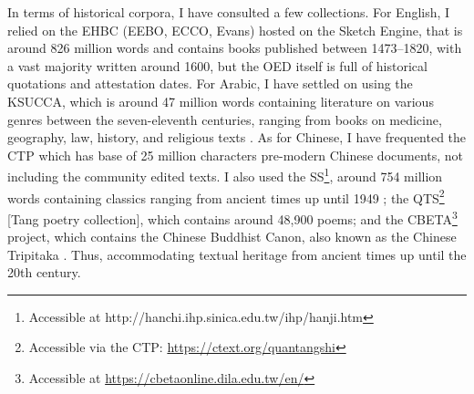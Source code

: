 In terms of historical corpora, I have consulted a few collections. For English, I relied on the \gls{EHBC} (EEBO, ECCO, Evans) hosted on the Sketch Engine, that is around 826 million words and contains books published between 1473--1820, with a vast majority written around 1600, but the \gls{OED} itself is full of historical quotations and attestation dates.
For Arabic, I have settled on using the \gls{KSUCCA}, which is around 47 million words containing literature on various genres between the seven-eleventh centuries, ranging from books on medicine, geography, law, history, and religious texts \autocite{alrabiah_design_2013,alrabiah_empirical_2014}. As for Chinese, I have frequented the \gls{CTP} \autocite{sturgeon_chinese_nodate,sturgeon_chinese_2021} which has base of 25 million characters pre-modern Chinese documents, not including the community edited texts. I also used the \gls{SS}\footnote{Accessible at http://hanchi.ihp.sinica.edu.tw/ihp/hanji.htm}, around 754 million words containing classics ranging from ancient times up until 1949 \autocite{academia_sinica_scripta_1993}; the \gls{QTS}\footnote{Accessible via the \gls{CTP}: \url{https://ctext.org/quantangshi}} [Tang poetry collection], which contains around 48,900 poems; and the \gls{CBETA}\footnote{Accessible at \url{https://cbetaonline.dila.edu.tw/en/}} project, which contains the Chinese Buddhist Canon, also known as the Chinese Tripitaka \autocite[365-386]{chen_buddhism_1964}. Thus, accommodating textual heritage from ancient times up until the 20th century.


